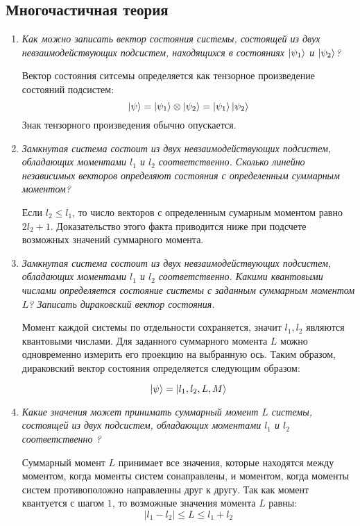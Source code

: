 \documentclass{article}
\begin{document}
\subsection*{Многочастичная теория}
\begin{enumerate}
	\item \textit{Как можно записать вектор состояния системы, состоящей из двух невзаимодействующих подсистем, находящихся в состояниях $\ket{\psi_1}$ и $\ket{\psi_2}$?}	
	
	Вектор состояния ситсемы определяется как тензорное произведение состояний подсистем:
	\begin{equation}
		\ket{\psi} = \ket{\psi_1} \otimes \ket{\psi_2} = \ket{\psi_1} \ket{\psi_2}
	\end{equation}
	Знак тензорного произведения обычно опускается.
	
	\item \textit{Замкнутая система состоит из двух невзаимодействующих подсистем, обладающих моментами $l_1$ и $l_2$ соответственно. Сколько линейно независимых векторов определяют состояния с определенным суммарным моментом?}	
	
	Если $l_2 \leq l_1$, то число векторов с определенным сумарным моментом равно $2l_2 + 1$. Доказательство этого факта приводится ниже при подсчете возможных значений суммарного момента.
	
	\item \textit{Замкнутая система состоит из двух невзаимодействующих подсистем, обладающих моментами $l_1$ и $l_2$ соответственно. Какими квантовыми числами определяется состояние системы с заданным суммарным моментом $L$? Записать дираковский вектор состояния.}	
	
	Момент каждой системы по отдельности сохраняется, значит $l_1, l_2$ являются квантовыми числами. Для заданного суммарного момента $L$ можно одновременно измерить его проекцию на выбранную ось. Таким образом, дираковский вектор состояния определяется следующим образом:
	
	\begin{equation}
		\ket{\psi} = \ket{l_1, l_2, L, M}
	\end{equation}
	
	\item \textit{Какие значения может принимать суммарный момент $L$ системы, состоящей из двух подсистем, обладающих моментами $l_1$ и $l_2$ соответственно ?}
	
	Суммарный момент $L$ принимает все значения, которые находятся между моментом, когда моменты систем сонаправлены, и моментом, когда моменты систем противоположно направленны друг к другу. Так как момент квантуется с шагом $1$, то возможные значения момента $L$ равны:
	\begin{equation}
		|l_1 - l_2| \leq L \leq l_1 + l_2
	\end{equation}
	

\end{enumerate}
\end{document}
